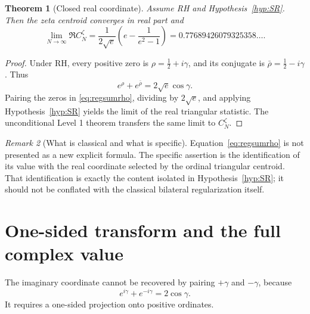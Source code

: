 \documentclass[11pt]{amsart}
\numberwithin{equation}{section}
\newtheorem{theorem}{Theorem}[section]
\theoremstyle{definition}
\theoremstyle{remark}
\newtheorem{remark}[theorem]{Remark}
\begin{document}
\begin{theorem}[Closed real coordinate]\label{thm:realconstant}
Assume RH and Hypothesis~\ref{hyp:SR}. Then the zeta centroid converges in real part and
\begin{equation}\label{eq:realclosed}
\boxed{
\lim_{N\to\infty}\Re C_N^{\zeta}
=\frac{1}{2\sqrt e}\left(e-\frac1{e^2-1}\right)
=0.77689426079325358\ldots.
}
\end{equation}
\end{theorem}
\begin{proof}
Under RH, every positive zero is $\rho=\tfrac12+i\gamma$, and its conjugate is $\bar\rho=\tfrac12-i\gamma$. Thus
\[
e^{\rho}+e^{\bar\rho}=2\sqrt e\cos\gamma.
\]
Pairing the zeros in \eqref{eq:regsumrho}, dividing by $2\sqrt e$, and applying Hypothesis~\ref{hyp:SR} yields the limit of the real triangular statistic. The unconditional Level 1 theorem transfers the same limit to $C_N^{\zeta}$.
\end{proof}

\begin{remark}[What is classical and what is specific]
Equation~\eqref{eq:regsumrho} is not presented as a new explicit formula. The specific assertion is the identification of its value with the real coordinate selected by the ordinal triangular centroid. That identification is exactly the content isolated in Hypothesis~\ref{hyp:SR}; it should not be conflated with the classical bilateral regularization itself.
\end{remark}

\section{One-sided transform and the full complex value}\label{sec:imaginary}

The imaginary coordinate cannot be recovered by pairing $+\gamma$ and $-\gamma$, because
\[
e^{i\gamma}+e^{-i\gamma}=2\cos\gamma.
\]
It requires a one-sided projection onto positive ordinates.
\end{document}
